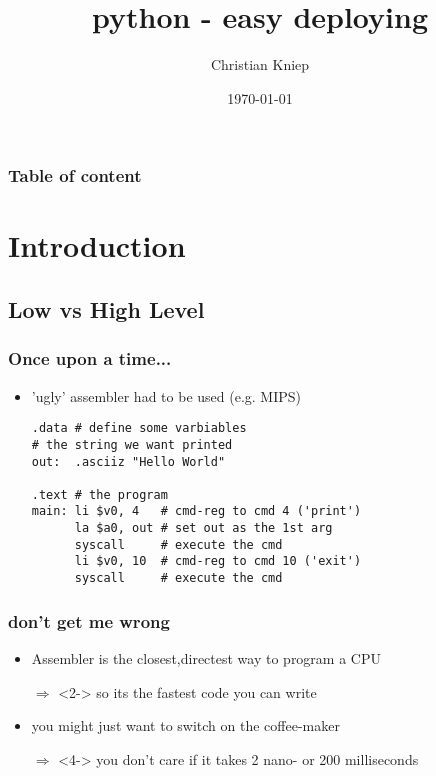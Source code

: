 \documentclass[handout]{beamer}
\author{Christian Kniep}
\begin{document}
\title[python - easy deploying]{python - easy deploying}  
\date[\today]{\today} 

\begin{frame}
	\titlepage
\end{frame} 

\begin{frame}
	\frametitle{Table of content}
	\tableofcontents
\end{frame} 


\section{Introduction} 
	\subsection{Low vs High Level}
		\begin{frame}[fragile]
			\frametitle{Once upon a time...}
			\begin{itemize}
				\item<1-> 'ugly' assembler had to be used (e.g. MIPS)
                \begin{verbatim}
.data # define some varbiables
# the string we want printed
out:  .asciiz "Hello World"
 
.text # the program
main: li $v0, 4	  # cmd-reg to cmd 4 ('print')  
      la $a0, out # set out as the 1st arg 
      syscall     # execute the cmd
      li $v0, 10  # cmd-reg to cmd 10 ('exit')
      syscall     # execute the cmd
\end{verbatim}
            \end{itemize}
		\end{frame}
		\begin{frame}
			\frametitle{don't get me wrong}
			\begin{itemize}
				\item<1-> Assembler is the closest,directest way to program a CPU
                \item[$\Rightarrow$]<2-> so its the fastest code you can write
                \item<3-> you might just want to switch on the coffee-maker
                \item[$\Rightarrow$]<4-> you don't care if it takes 2 nano- or 200 milliseconds
            \end{itemize}
        \end{frame}
\end{document}
